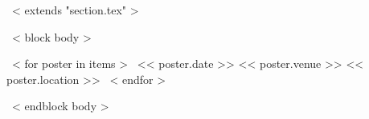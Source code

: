 ~< extends "section.tex" >~

~< block body >~
\begin{entrylistTwo}
~< for poster in items >~
\entryTwo
{<< poster.date >>}
{<< poster.venue >>}
{<< poster.location >>}
~< endfor >~
\end{entrylistTwo}
~< endblock body >~
